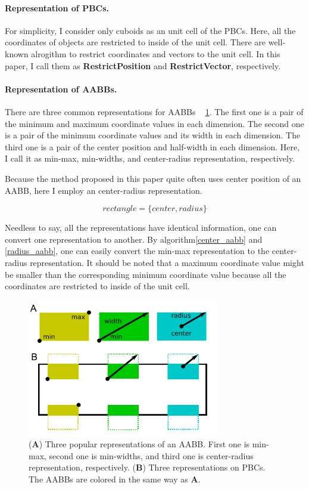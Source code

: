 \documentclass[10pt,letterpaper,twocolumn]{article}
\begin{document}
\paragraph{Representation of PBCs.}
For simplicity, I consider only cuboids as an unit cell of the PBCs.
Here, all the coordinates of objects are restricted to inside of the unit cell.
There are well-known alrogithm to restrict coordinates and vectors to the unit cell.
In this paper, I call them as \textbf{RestrictPosition} and
\textbf{RestrictVector}, respectively.

\paragraph{Representation of AABBs.}
There are three common representations for AABBs
~\cite{real-time-collision-detection} \ref{fig-rectangle-rep}.
The first one is a pair of the minimum and maximum coordinate values
in each dimension. The second one is a pair of the minimum coordinate values and
its width in each dimension. The third one is a pair of the center position and
half-width in each dimension. Here, I call it as min-max, min-widths, and
center-radius representation, respectively.

Because the method proposed in this paper quite often uses center position of
an AABB, here I employ an center-radius representation.

\begin{equation}
    rectangle = \{center, radius\}
\end{equation}

Needless to say, all the representations have identical information, one can
convert one representation to another. By algorithm\ref{center_aabb} and
\ref{radius_aabb}, one can easily convert the min-max representation to
the center-radius representation. It should be noted that a maximum coordinate
value might be smaller than the corresponding minimum coordinate value because
all the coordinates are restricted to inside of the unit cell.

\begin{figure}[hbt]
    \includegraphics[width=8.4cm, bb=2 6 226 165]{fig-rect-rep.eps}
    \caption{
    (\textbf{A})
    Three popular representations of an AABB. First one is min-max,
    second one is min-widths, and third one is center-radius representation,
    respectively.
    (\textbf{B})
    Three representations on PBCs. The AABBs are colored in the same way as
    \textbf{A}.
    }
    \label{fig-rectangle-rep}
\end{figure}
\end{document}
